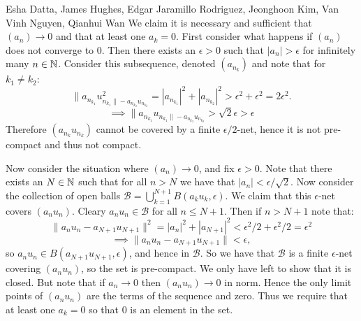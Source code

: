 

\begin{solution}{Esha Datta, James Hughes, Edgar Jaramillo Rodriguez, Jeonghoon Kim, Van Vinh Nguyen, Qianhui Wan}
        We claim it is necessary and sufficient that $(a_n) \to 0$ and that at least one $a_k=0$.
        First consider what happens if $(a_n)$ does not converge to 0.
        Then there exists an $\epsilon >0$ such that $|a_n| > \epsilon$ for infinitely many $n\in \mathbb{N}$.
        Consider this subsequence, denoted $(a_{n_k})$ and note that for $k_1 \neq k_2$:
        \[ \lVert a_{n_{k_1}}u_{n_{k_1} \rVert
        - a_{n_{k_2}}u_{n_{k_2}}}^2 = |a_{n_{k_1}}|^2 + |a_{n_{k_2}}|^2 > \epsilon^2 +\epsilon^2 = 2 \epsilon^2. \]
        \[ \implies \lVert a_{n_{k_1}}u_{n_{k_1} \rVert
        - a_{n_{k_2}}u_{n_{k_2}}} > \sqrt{2}\epsilon > \epsilon \]
        Therefore  $(a_{n_k}u_{n_{k}})$ cannot be covered by a finite $\epsilon/2$-net, hence it is not pre-compact and thus not compact. 

        Now consider the situation where $(a_n)\to 0$, and fix $\epsilon >0$.
        Note that there exists an $N \in \mathbb{N}$ such that for all $n>N$ we have that $|a_n| < \epsilon/\sqrt{2}$.
        Now consider the collection of open balls $\mathcal{B} =  \bigcup_{k=1}^{N+1}B(a_ku_k,\epsilon)$.
        We claim that this $\epsilon$-net covers $(a_n u_n)$.
        Cleary $a_nu_n \in \mathcal{B}$ for all $n \leq N+1$. Then if $n>N+1$ note that:
        \[ \lVert a_nu_n - a_{N+1}u_{N+1} \rVert^2 = |a_n|^2 +|a_{N+1}|^2 < \epsilon^2/2 + \epsilon^2/2 = \epsilon^2 \]
        \[ \implies \lVert a_nu_n - a_{N+1}u_{N+1} \rVert < \epsilon, \]
        so $a_nu_n \in B(a_{N+1}u_{N+1},\epsilon)$, and hence in $\mathcal{B}$.
        So we have that $\mathcal{B}$ is a finite $\epsilon$-net covering $(a_nu_n)$, so the set is pre-compact.
        We only have left to show that it is closed.
        But note that if $a_n\to 0$ then $(a_nu_n) \to 0$ in norm.
        Hence the only limit points of $(a_nu_n)$ are the terms of the sequence and zero.
        Thus we require that at least one $a_k=0$ so that 0 is an element in the set.
\end{solution}


